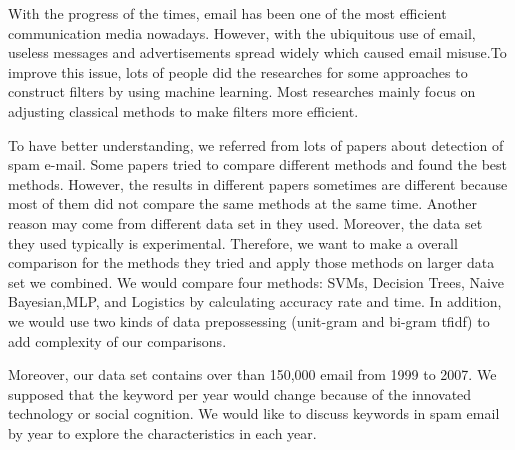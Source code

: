 
\quad  With the progress of the times, email has been one of the most efficient communication media nowadays. However, with the ubiquitous use of email, useless messages and advertisements spread widely which caused email misuse.To improve this issue, lots of people did the researches for some approaches to construct filters by using machine learning. Most researches mainly focus on adjusting classical methods to make filters more efficient.

\quad To have better understanding, we referred from lots of papers about detection of spam e-mail. Some papers tried to compare different methods and found the best methods. However, the results in different papers sometimes are different because most of them did not compare the same methods at the same time. Another reason may come from different data set in they used. Moreover, the data set they used typically is experimental. Therefore, we want to make a overall comparison for the methods they tried and apply those methods on larger data set we combined. We would compare four methods: SVMs, Decision Trees, Naive Bayesian,MLP, and Logistics by calculating accuracy rate and time. In addition, we would use two kinds of data prepossessing (unit-gram and bi-gram tfidf) to add complexity of our comparisons.

\quad Moreover, our data set contains over than 150,000 email from 1999 to 2007. We supposed that the keyword per year would change because of the innovated technology or social cognition. We would like to discuss keywords in spam email by year to explore the characteristics in each year.
\quad 

